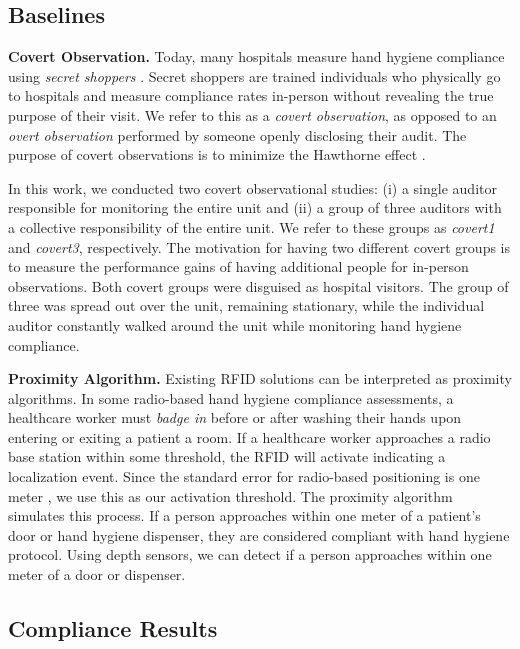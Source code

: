 \documentclass[twoside,11pt]{article}
\begin{document}
\subsection{Baselines}
\textbf{Covert Observation.} Today, many hospitals measure hand hygiene compliance using \textit{secret shoppers} \citep{morgan2012automated}.
Secret shoppers are trained individuals who physically go to hospitals and measure compliance rates in-person without revealing the true purpose of their visit.
We refer to this as a \textit{covert observation}, as opposed to an \textit{overt observation} performed by someone openly disclosing their audit.
The purpose of covert observations is to minimize the Hawthorne effect \citep{adair1984hawthorne}.

In this work, we conducted two covert observational studies: (i) a single auditor responsible for monitoring the entire unit and (ii) a group of three auditors with a collective responsibility of the entire unit.
We refer to these groups as \textit{covert1} and \textit{covert3}, respectively.
The motivation for having two different covert groups is to measure the performance gains of having additional people for in-person observations.
Both covert groups were disguised as hospital visitors.
The group of three was spread out over the unit, remaining stationary, while the individual auditor constantly walked around the unit while monitoring hand hygiene compliance.

\textbf{Proximity Algorithm.}
Existing RFID solutions can be interpreted as proximity algorithms.
In some radio-based hand hygiene compliance assessments, a healthcare worker must \textit{badge in} before or after washing their hands upon entering or exiting a patient a room.
If a healthcare worker approaches a radio base station within some threshold, the RFID will activate indicating a localization event.
Since the standard error for radio-based positioning is one meter \citep{whitehouse2007practical, alahi2015rgbw, zanca2008experimental}, we use this as our activation threshold.
The proximity algorithm simulates this process.
If a person approaches within one meter of a patient's door or hand hygiene dispenser, they are considered compliant with hand hygiene protocol.
Using depth sensors, we can detect if a person approaches within one meter of a door or dispenser.

\subsection{Compliance Results}
\end{document}
